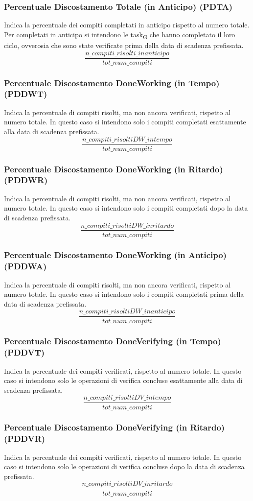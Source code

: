 \subsubsection{Percentuale Discostamento Totale (in Anticipo) (PDTA)}
Indica la percentuale dei compiti completati in anticipo rispetto al numero totale. Per completati in anticipo si intendono le task\textsubscript{G} che hanno completato il loro ciclo, ovverosia che sono state verificate prima della data di scadenza prefissata.
\[\frac{n\_compiti\_risolti\_inanticipo}{tot\_num\_compiti}\]

\subsubsection{Percentuale Discostamento DoneWorking (in Tempo) (PDDWT)}
Indica la percentuale di compiti risolti, ma non ancora verificati, rispetto al numero totale. In questo caso si intendono solo i compiti completati esattamente alla data di scadenza prefissata.
\[\frac{n\_compiti\_risoltiDW\_intempo}{tot\_num\_compiti}\]
\subsubsection{Percentuale Discostamento DoneWorking (in Ritardo) (PDDWR)}
Indica la percentuale di compiti risolti, ma non ancora verificati, rispetto al numero totale. In questo caso si intendono solo i compiti completati dopo la data di scadenza prefissata.
\[\frac{n\_compiti\_risoltiDW\_inritardo}{tot\_num\_compiti}\]
\subsubsection{Percentuale Discostamento DoneWorking (in Anticipo) (PDDWA)}
Indica la percentuale di compiti risolti, ma non ancora verificati, rispetto al numero totale. In questo caso si intendono solo i compiti completati prima della data di scadenza prefissata.
\[\frac{n\_compiti\_risoltiDW\_inanticipo}{tot\_num\_compiti}\]
\subsubsection{Percentuale Discostamento DoneVerifying (in Tempo) (PDDVT)}
Indica la percentuale dei compiti verificati, rispetto al numero totale. In questo caso si intendono solo le operazioni di verifica concluse esattamente alla data di scadenza prefissata.
\[\frac{n\_compiti\_risoltiDV\_intempo}{tot\_num\_compiti}\]

\subsubsection{Percentuale Discostamento DoneVerifying (in Ritardo) (PDDVR)}
Indica la percentuale dei compiti verificati, rispetto al numero totale. In questo caso si intendono solo le operazioni di verifica concluse dopo la data di scadenza prefissata.
\[\frac{n\_compiti\_risoltiDV\_inritardo}{tot\_num\_compiti}\]
